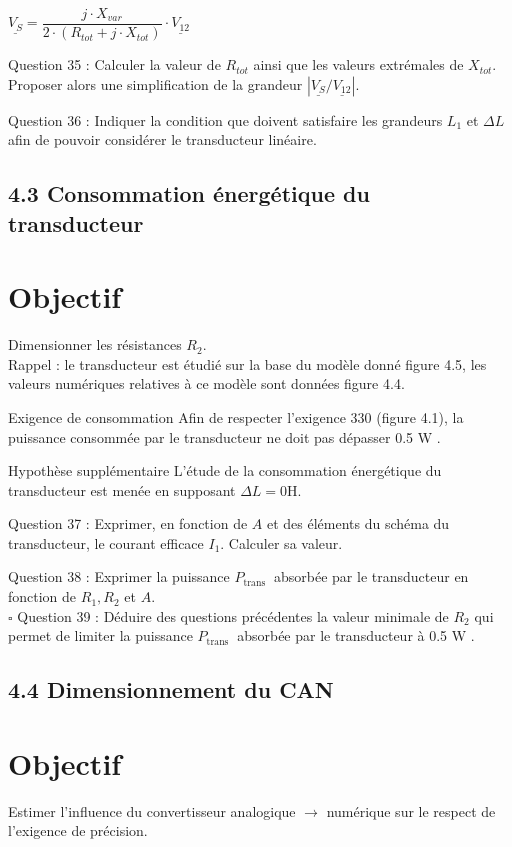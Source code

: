 $
\underline{V_{S}}=\dfrac{j \cdot X_{v a r}}{2 \cdot\left(R_{t o t}+j \cdot X_{t o t}\right)} \cdot \underline{V_{12}}
$

Question 35 : Calculer la valeur de \(R_{t o t}\) ainsi que les valeurs extrémales de \(X_{t o t}\). Proposer alors une simplification de la grandeur \(\left|\underline{V_{S}} / \underline{V_{12}}\right|\).

Question 36 : Indiquer la condition que doivent satisfaire les grandeurs \(L_{1}\) et \(\Delta L\) afin de pouvoir considérer le transducteur linéaire.

\subsection{4.3 Consommation énergétique du transducteur}
\section{Objectif}
Dimensionner les résistances \(R_{2}\).\\
Rappel : le transducteur est étudié sur la base du modèle donné figure 4.5, les valeurs numériques relatives à ce modèle sont données figure 4.4.

Exigence de consommation Afin de respecter l'exigence 330 (figure 4.1), la puissance consommée par le transducteur ne doit pas dépasser 0.5 W .

Hypothèse supplémentaire L'étude de la consommation énergétique du transducteur est menée en supposant \(\Delta L=0 \mathrm{H}\).

Question 37 : Exprimer, en fonction de \(A\) et des éléments du schéma du transducteur, le courant efficace \(I_{1}\). Calculer sa valeur.

Question 38 : Exprimer la puissance \(P_{\text {trans }}\) absorbée par le transducteur en fonction de \(R_{1}, R_{2}\) et \(A\).\\
\(\square\) Question 39 : Déduire des questions précédentes la valeur minimale de \(R_{2}\) qui permet de limiter la puissance \(P_{\text {trans }}\) absorbée par le transducteur à 0.5 W .

\subsection{4.4 Dimensionnement du CAN}
\section{Objectif}
Estimer l'influence du convertisseur analogique \(\rightarrow\) numérique sur le respect de l'exigence de précision.

